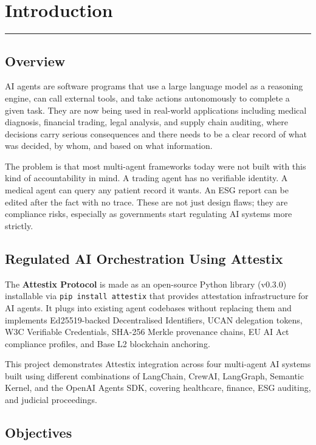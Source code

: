 \chapter{Introduction}
\noindent\rule{\linewidth}{2pt}

\section{Overview}

AI agents are software programs that use a large language model as a reasoning engine, can call external tools, and take actions autonomously to complete a given task. They are now being used in real-world applications including medical diagnosis, financial trading, legal analysis, and supply chain auditing, where decisions carry serious consequences and there needs to be a clear record of what was decided, by whom, and based on what information.

The problem is that most multi-agent frameworks today were not built with this kind of accountability in mind. A trading agent has no verifiable identity. A medical agent can query any patient record it wants. An ESG report can be edited after the fact with no trace. These are not just design flaws; they are compliance risks, especially as governments start regulating AI systems more strictly.

\section{Regulated AI Orchestration Using Attestix}

The \textbf{Attestix Protocol} is made as an open-source Python library (v0.3.0) installable via \texttt{pip install attestix} that provides attestation infrastructure for AI agents. It plugs into existing agent codebases without replacing them and implements Ed25519-backed Decentralised Identifiers, UCAN delegation tokens, W3C Verifiable Credentials, SHA-256 Merkle provenance chains, EU AI Act compliance profiles, and Base L2 blockchain anchoring.

This project demonstrates Attestix integration across four multi-agent AI systems built using different combinations of LangChain, CrewAI, LangGraph, Semantic Kernel, and the OpenAI Agents SDK, covering healthcare, finance, ESG auditing, and judicial proceedings.

\section{Objectives}

